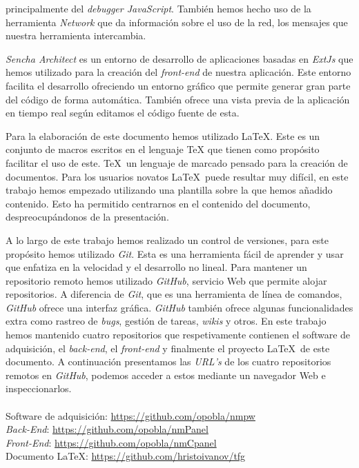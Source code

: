 	principalmente del \emph{debugger JavaScript}. También hemos hecho uso de la herramienta \emph{Network} que da información sobre el uso de la red, los
	mensajes que nuestra herramienta intercambia.
	\par
	\emph{Sencha Architect} es un entorno de desarrollo de aplicaciones basadas en \emph{ExtJs} que hemos utilizado para la creación del \emph{front-end} de
	nuestra aplicación. Este entorno facilita el desarrollo ofreciendo un entorno gráfico que permite generar gran parte del código de forma
	automática. También ofrece una vista previa de la aplicación en tiempo real según editamos el código fuente de esta. 
	\par
	Para la elaboración de este documento hemos utilizado \LaTeX\cite{latex}. Este es un conjunto de macros escritos en el lenguaje \TeX\cite{tex}
	que tienen como propósito facilitar el uso de este. \TeX\ un lenguaje de marcado pensado para la creación de documentos. Para los
	usuarios novatos \LaTeX\ puede resultar muy difícil, en este trabajo hemos empezado utilizando una plantilla sobre la que hemos añadido
	contenido. Esto ha permitido centrarnos en el contenido del documento, despreocupándonos de la presentación. 
	\par
	A lo largo de este trabajo hemos realizado un control de versiones, para este propósito hemos utilizado \emph{Git}\cite{git}. Esta es una herramienta
	fácil de aprender y usar que enfatiza en la velocidad y el desarrollo no lineal. Para mantener un repositorio remoto hemos utilizado
	\emph{GitHub}\cite{github}, servicio Web que permite alojar repositorios. A diferencia de \emph{Git}, que es una herramienta de línea de
	comandos, \emph{GitHub}
	ofrece una interfaz gráfica. \emph{GitHub} también ofrece algunas funcionalidades extra como rastreo de \emph{bugs}, gestión de tareas,
	\emph{wikis} y otros. En
	este trabajo hemos mantenido cuatro repositorios que respetivamente contienen el software de adquisición, el \emph{back-end}, el
	\emph{front-end} y finalmente el proyecto \LaTeX\ de este documento. A continuación presentamos las \emph{URL’s} de los cuatro repositorios remotos en
	\emph{GitHub}, podemos acceder a estos mediante un navegador Web e inspeccionarlos. 
	\\
	\\	Software de adquisición:	\hfill	\url{https://github.com/opobla/nmpw}
	\\	\emph{Back-End}:		\hfill	\url{https://github.com/opobla/nmPanel}
	\\	\emph{Front-End}:		\hfill	\url{https://github.com/opobla/nmCpanel}
	\\	Documento \LaTeX:		\hfill	\url{https://github.com/hristoivanov/tfg}
